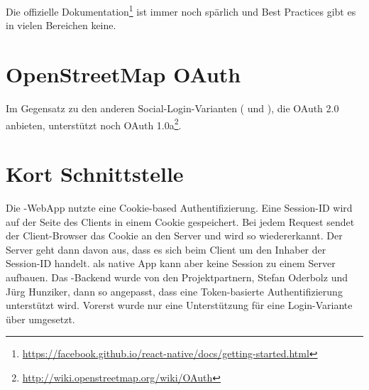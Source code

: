 Die offizielle Dokumentation\footnote{\url{https://facebook.github.io/react-native/docs/getting-started.html}} ist immer noch spärlich und Best Practices gibt es in vielen Bereichen keine.


\section{OpenStreetMap OAuth}
Im Gegensatz zu den anderen Social-Login-Varianten ( und ), die OAuth 2.0 anbieten, unterstützt  noch OAuth 1.0a\footnote{\url{http://wiki.openstreetmap.org/wiki/OAuth}}.


\section{Kort Schnittstelle}
Die \kort{}-\gls{WebApp} nutzte eine Cookie-based Authentifizierung.\cite{ba-kort-2012} 
Eine Session-ID wird auf der Seite des Clients in einem Cookie gespeichert. 
Bei jedem Request sendet der Client-Browser das Cookie an den Server und wird so wiedererkannt. 
Der Server geht dann davon aus, dass es sich beim Client um den Inhaber der Session-ID handelt. 
\kort{} als native App kann aber keine Session zu einem Server aufbauen.
Das \kort{}-Backend wurde von den Projektpartnern, Stefan Oderbolz und Jürg Hunziker, dann so angepasst, dass eine Token-basierte Authentifizierung unterstützt wird.
Vorerst wurde nur eine Unterstützung für eine Login-Variante über  umgesetzt.

